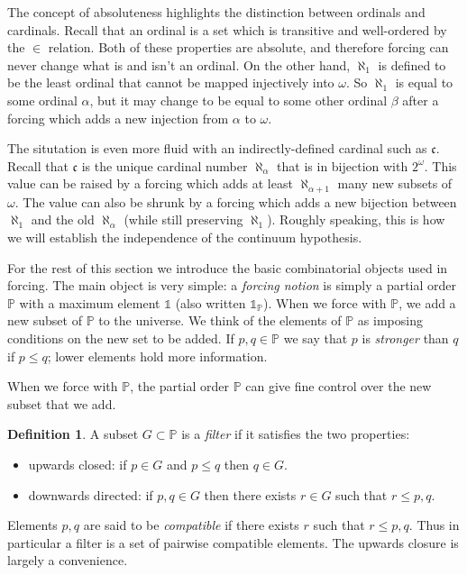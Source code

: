 \documentclass[11pt,oneside]{amsbook}
\newcommand{\PP}{\mathbb P}
\theoremstyle{definition}
\theoremstyle{plain}
\theoremstyle{definition}
\newtheorem{definition}[theorem]{Definition}
\theoremstyle{remark}
\numberwithin{equation}{section}
\numberwithin{figure}{section}
\begin{document}
The concept of absoluteness highlights the distinction between ordinals and cardinals. Recall that an ordinal is a set which is transitive and well-ordered by the $\in$ relation. Both of these properties are absolute, and therefore forcing can never change what is and isn't an ordinal. On the other hand, $\aleph_1$ is defined to be the least ordinal that cannot be mapped injectively into $\omega$. So $\aleph_1$ is equal to some ordinal $\alpha$, but it may change to be equal to some other ordinal $\beta$ after a forcing which adds a new injection from $\alpha$ to $\omega$.

The situtation is even more fluid with an indirectly-defined cardinal such as $\mathfrak c$. Recall that $\mathfrak c$ is the unique cardinal number $\aleph_\alpha$ that is in bijection with $2^\omega$. This value can be raised by a forcing which adds at least $\aleph_{\alpha+1}$ many new subsets of $\omega$. The value can also be shrunk by a forcing which adds a new bijection between $\aleph_1$ and the old $\aleph_\alpha$ (while still preserving $\aleph_1$). Roughly speaking, this is how we will establish the independence of the continuum hypothesis.

For the rest of this section we introduce the basic combinatorial objects used in forcing. The main object is very simple: a \emph{forcing notion} is simply a partial order $\PP$ with a maximum element $\mathbb1$ (also written $\mathbb1_\PP$). When we force with $\PP$, we add a new subset of $\PP$ to the universe. We think of the elements of $\PP$ as imposing conditions on the new set to be added. If $p,q\in\PP$ we say that $p$ is \emph{stronger} than $q$ if $p\leq q$; lower elements hold more information.

When we force with $\PP$, the partial order $\PP$ can give fine control over the new subset that we add.

\begin{definition}
  A subset $G\subset\PP$ is a \emph{filter} if it satisfies the two properties:
  \begin{itemize}
  \item upwards closed: if $p\in G$ and $p\leq q$ then $q\in G$.
  \item downwards directed: if $p,q\in G$ then there exists $r\in G$ such that $r\leq p,q$.
  \end{itemize}
\end{definition}

Elements $p,q$ are said to be \emph{compatible} if there exists $r$ such that $r\leq p,q$. Thus in particular a filter is a set of pairwise compatible elements. The upwards closure is largely a convenience.
\end{document}
